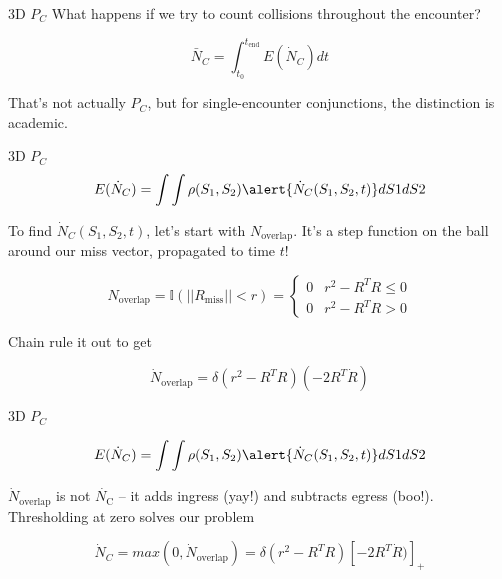 \documentclass[pdf]{beamer}
\begin{document}
\begin{frame}{3D $P_C$}
  What happens if we try to count collisions throughout the encounter?

  \[ \bar{N}_C = \int_{t_0}^{t_\text{end}} E(\dot{N}_C) dt\]

  That's not actually $P_C$, but for single-encounter conjunctions, the
  distinction is academic.
\end{frame}


\begin{frame}{3D $P_C$}
  \[ E(\dot{N}_C) = \int \int \rho(S_1, S_2) \alert{\dot{N}_C(S_1, S_2, t)} dS1dS2\]

  To find $\dot{N}_C(S_1, S_2, t)$, let's start with $N_\text{overlap}$. It's a step function on the
  ball around our miss vector, propagated to time $t$!

  \[ N_\text{overlap} = \mathbb{I}(||R_\text{miss}|| < r) = \begin{cases} 
      0 & r^2 - R^T R \leq 0 \\
      0 & r^2 - R^T R > 0 
    \end{cases}
  \]

  Chain rule it out to get

  \[ \dot{N}_\text{overlap} = \delta(r^2 - R^T R)(-2R^T \dot{R})\]
\end{frame}

\begin{frame}{3D $P_C$}

  \[ E(\dot{N}_C) = \int \int \rho(S_1, S_2) \alert{\dot{N}_C(S_1, S_2, t)} dS1dS2\]

  $\dot{N}_\text{overlap}$ is not $\dot{N_\text{C}}$ -- it adds ingress
  (yay!) and subtracts egress (boo!). Thresholding at zero solves our problem

  \[ \dot{N}_C = max(0, \dot{N}_\text{overlap}) = \delta(r^2 - R^T R)[-2R^T \dot{R})]_{+}\]
  
\end{frame}
\end{document}
